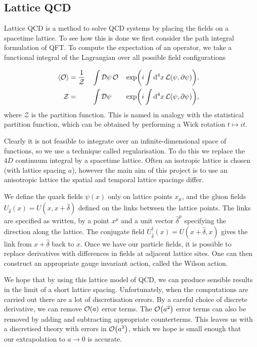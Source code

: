 \documentclass[a4paper,12pt]{article}
\begin{document}
\subsection{Lattice QCD}
Lattice QCD is a method to solve QCD systems by placing the fields on a spacetime lattice. To see how this is done we first consider the path integral formulation of QFT\@. To compute the expectation of an operator, we take a functional integral of the Lagrangian over all possible field configurations\cite{1948Feynman, 2015Colquhoun}

\begin{alignat}{3}
    \label{eq:PathIntegral}
    \expval{\mathcal{O}} &= \dfrac{1}{\mathcal{Z}}&&\int\mathinner{\operatorname{\mathrm{\mathcal{D}}}\!\psi} \mathcal{O}  &&\exp(i \int \dd[4]{x} \mathcal{L}(\psi, \partial \psi)), \\
    \mathcal{Z}          &=                       &&\int\mathinner{\operatorname{\mathrm{\mathcal{D}}}\!\psi}              &&\exp(i \int \dd[4]{x} \mathcal{L}(\psi, \partial \psi)),
\end{alignat}
where $\mathcal{Z}$ is the partition function. This is named in analogy with the statistical partition function, which can be obtained by performing a Wick rotation $t \mapsto it$.

Clearly it is not feasible to integrate over an infinite-dimensional space of functions, so we use a technique called regularisation. To do this we replace the $4D$ continuum integral by a spacetime lattice. Often an isotropic lattice is chosen (with lattice spacing $a$), however the main aim of this project is to use an anisotropic lattice the spatial and temporal lattice spacings differ.

We define the quark fields\cite{2015Colquhoun} $\psi(x)$ only on lattice points $x_\mu$, and the gluon fields $U_{\hat{\delta}}(x) = U(x, x + \hat{\delta})$ defined on the links between the lattice points. The links are specified as written, by a point $x^\mu$ and a unit vector $\hat{\delta}^\mu$ specifying the direction along the lattice. The conjugate field $U^\dagger_{\hat{\delta}}(x) = U(x + \hat{\delta}, x)$ gives the link from $x+\hat{\delta}$ back to $x$. Once we have our particle fields, it is possible to replace derivatives with differences in fields at adjacent lattice sites. One can then construct an appropriate gauge invariant action, called the Wilson action.

We hope that by using this lattice model of QCD, we can produce sensible results in the limit of a short lattice spacing. Unfortunately, when the computations are carried out there are a lot of discretisation errors\cite{2009LatticeDiscretization}. By a careful choice of discrete derivative, we can remove $\order{a}$ error terms. The $\order{a^2}$ error terms can also be removed by adding and subtracting appropriate counterterms\cite{1983ImproveLatticeAction}. This leaves us with a discretised theory with errors in $\order{a^3}$, which we hope is small enough that our extrapolation to $a \rightarrow 0$ is accurate.
\end{document}
